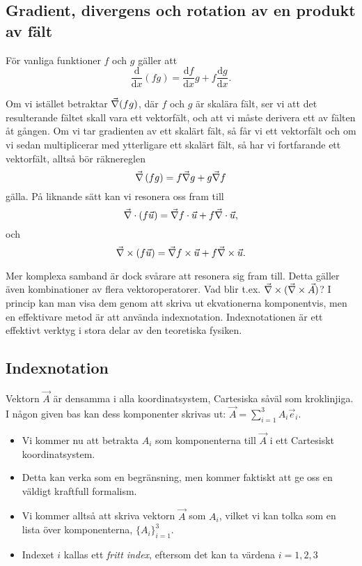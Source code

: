 \documentclass[%
oneside,                 %
final,                   %
10pt]{article}
\begin{document}
\subsection*{Gradient, divergens och rotation av en produkt av fält}

För vanliga funktioner $f$ och $g$ gäller att
\begin{equation}
  \frac{\mbox{d}}{\mbox{d}x}\left(fg\right) = \frac{\mbox{d}f}{\mbox{d}x}g
+ f\frac{\mbox{d}g}{\mbox{d}x}.
\end{equation}

Om vi istället betraktar $\vec{\nabla} (fg)$, där $f$ och $g$ är skalära fält, ser vi att det resulterande fältet skall vara ett vektorfält, och att vi måste derivera ett av fälten åt gången. Om vi tar gradienten av ett skalärt fält, så får vi ett vektorfält och om vi sedan multiplicerar med ytterligare ett skalärt fält, så har vi fortfarande ett vektorfält, alltså bör räknereglen
\begin{equation}
  \vec{\nabla} \left(fg\right) = f \vec{\nabla} g + g\vec{\nabla} f
\end{equation}
gälla. På liknande sätt kan vi resonera oss fram till
\begin{equation}
  \vec{\nabla} \cdot \left(f\vec{u}\right) = \vec{\nabla} f \cdot \vec{u} + f \vec{\nabla} \cdot \vec{u},
\end{equation}
och
\begin{equation}
  \vec{\nabla} \times \left(f\vec{u}\right) = \vec{\nabla} f\times \vec{u} + f \vec{\nabla} \times \vec{u}.
\end{equation}

Mer komplexa samband är dock svårare att resonera sig fram till. Detta gäller även kombinationer av flera vektoroperatorer. Vad blir t.ex. $\vec{\nabla} \times (\vec{\nabla} \times \vec{A})$? I princip kan man visa dem genom att skriva ut ekvationerna komponentvis, men en effektivare metod är att använda indexnotation. Indexnotationen är ett effektivt verktyg i stora delar av den teoretiska fysiken.

\subsection*{Indexnotation}

Vektorn $\vec{A}$ är densamma i alla koordinatsystem, Cartesiska såväl som kroklinjiga. I någon given bas kan dess komponenter skrivas ut: $\vec{A}=\sum_{i=1}^3A_i\vec{e}_i$. 

\begin{itemize}
\item Vi kommer nu att betrakta $A_i$ som komponenterna till $\vec{A}$ i ett Cartesiskt koordinatsystem.

\item Detta kan verka som en begränsning, men kommer faktiskt att ge oss en väldigt kraftfull formalism.

\item Vi kommer alltså att skriva vektorn $\vec{A}$ som $A_i$, vilket vi kan tolka som en lista över komponenterna, $\{A_i\}_{i=1}^3$. 

\item Indexet $i$ kallas ett \emph{fritt index}, eftersom det kan ta värdena $i=1,2,3$ 
\end{itemize}
\end{document}
